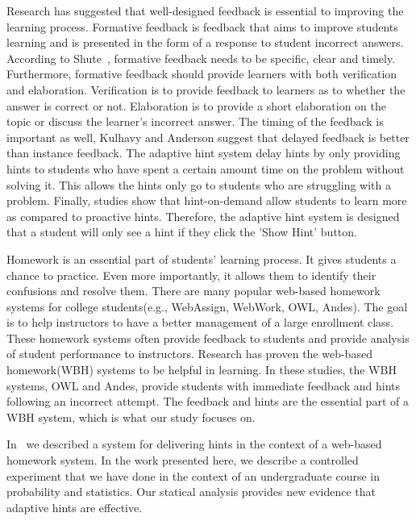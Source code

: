 \documentclass{llncs}
\begin{document}
Research has suggested that well-designed feedback is essential to improving the learning process\cite{Azevedo1995}\cite{Bangert-Drowns1991}. Formative feedback is feedback that aims to improve students learning and is presented in the form of a response to student incorrect answers\cite{Shute2008}. According to Shute~\cite{Shute2008}, formative feedback needs to be specific, clear and timely. Furthermore, formative feedback should provide learners with both verification and elaboration\cite{Mason2001}\cite{Bangert-Drowns1991}. Verification is to provide feedback to learners as to whether the answer is correct or not. Elaboration is to provide a short elaboration on the topic or discuss the learner's incorrect answer. The timing of the feedback is important as well, Kulhavy and Anderson suggest that delayed feedback is better than instance feedback\cite{Kulhavy1972}. The adaptive hint system delay hints by only providing hints to students who have spent a certain amount time on the problem without solving it. This allows the hints only go to students who are struggling with a problem. Finally, studies show that hint-on-demand allow students to learn more as compared to proactive hints\cite{Razzaq2010}. Therefore, the adaptive hint system is designed that a student will only see a hint if they click the 'Show Hint' button.

Homework is an essential part of students' learning process\cite{Cooper2006}. It gives students a chance to practice. Even more importantly, it allows them to identify their confusions and resolve them. There are many popular web-based homework systems for college students(e.g., WebAssign, WebWork, OWL, Andes). The goal is to help instructors to have a better management of a large enrollment class. These homework systems often provide feedback to students and provide analysis of student performance to instructors. Research has proven the web-based homework(WBH) systems to be helpful in learning\cite{MestHartRath2002}\cite{Vanlehn2005}. In these studies, the WBH systems, OWL and Andes, provide students with immediate feedback and hints following an incorrect attempt\cite{MestHartRath2002}\cite{Vanlehn2005}. The feedback and hints are the essential part of a WBH system, which is what our study focuses on.

In~\cite{ElkherjFreund14} we described a system for delivering hints in the context of a web-based homework system. In the work presented here, we describe a controlled experiment that we have done in the context of an undergraduate course in probability and statistics. Our statical analysis provides new evidence that adaptive hints are effective.
\end{document}
